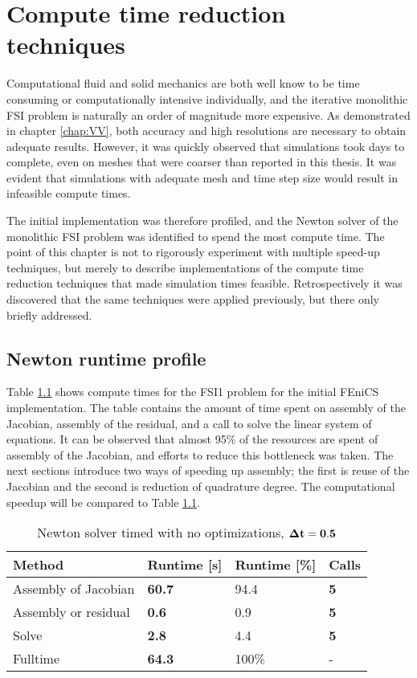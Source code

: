 \chapter{Compute time reduction techniques}\label{runtime}
Computational fluid and solid mechanics are both well know to be time consuming or computationally intensive individually, and the iterative monolithic FSI problem is naturally an order of magnitude more expensive. As demonstrated in chapter \ref{chap:VV}, both accuracy and high resolutions are necessary to obtain adequate results. However, it was quickly observed that simulations took days to complete, even on meshes that were coarser than reported in this thesis. It was evident that simulations with adequate mesh and time step size would result in infeasible compute times. 

The initial implementation was therefore profiled, and the Newton solver of the monolithic FSI problem was identified to spend the most compute time. The point of this chapter is not to rigorously experiment with multiple speed-up techniques, but merely to describe implementations of the compute time reduction techniques that made simulation times feasible. Retrospectively it was discovered that the same techniques were applied previously\cite{Sciences2012}, but there only briefly addressed. 

\section{Newton runtime profile}
Table \ref{no_opt} shows compute times for the FSI1 problem for the initial FEniCS implementation. The table contains the amount of time spent on assembly of the Jacobian, assembly of the residual, and a call to solve the linear system of equations. It can be observed that almost 95\% of the resources are spent of assembly of the Jacobian, and efforts to reduce this bottleneck was taken. The next sections introduce two ways of speeding up assembly; the first is reuse of the Jacobian and the second is reduction of quadrature degree. The computational speedup will be compared to Table \ref{no_opt}.

\begin{table}[H]
\centering
\caption{Newton solver timed with no optimizations, $\bold{\Delta t = 0.5}$ }
\label{no_opt}
\begin{tabular}{|l|l|l|l|}
\hline
Method               & \textbf{Runtime {{[}}s{{]}}} & Runtime {{[}}\%{{]}} & \textbf{Calls} \\ \hline
Assembly of Jacobian & \textbf{60.7}                    & 94.4                     & \textbf{5}     \\ \hline
Assembly or residual & \textbf{0.6}                     & 0.9                      & \textbf{5}     \\ \hline
Solve                & \textbf{2.8}                     & 4.4                      & \textbf{5}     \\ \hline
Fulltime             & \textbf{64.3}                    & 100\%                    & -                \\ \hline
\end{tabular}
\end{table}


